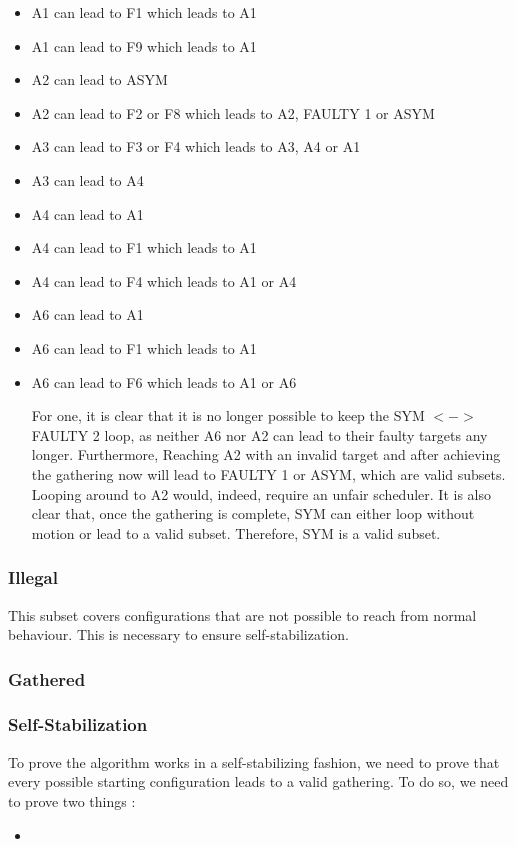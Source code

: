 \documentclass[11pt]{article}
\begin{document}
\begin{itemize}
\item A1 can lead to F1 which leads to A1 
\item A1 can lead to F9 which leads to A1 

\item A2 can lead to ASYM
\item A2 can lead to F2 or F8 which leads to A2, FAULTY 1 or ASYM

\item A3 can lead to F3 or F4 which leads to A3, A4 or A1
\item A3 can lead to A4 

\item A4 can lead to A1
\item A4 can lead to F1 which leads to A1 
\item A4 can lead to F4 which leads to A1 or A4

\item A6 can lead to A1 
\item A6 can lead to F1 which leads to A1 
\item A6 can lead to F6 which leads to A1 or A6

For one, it is clear that it is no longer possible to keep the SYM $<->$ FAULTY 2 loop, as neither A6 nor A2 can lead to their faulty targets any longer. Furthermore, Reaching A2 with an invalid target and after achieving the gathering now will lead to FAULTY 1 or ASYM, which are valid subsets. Looping around to A2 would, indeed, require an unfair scheduler.
It is also clear that, once the gathering is complete, SYM can either loop without motion or lead to a valid subset. Therefore, SYM is a valid subset.

\end{itemize}
\subsubsection{Illegal}

This subset covers configurations that are not possible to reach from normal behaviour. This is necessary to ensure self-stabilization.

\subsubsection{Gathered}

\subsubsection{Self-Stabilization}

To prove the algorithm works in a self-stabilizing fashion, we need to prove that every possible starting configuration leads to a valid gathering. To do so, we need to prove two things : 

\begin{itemize}
\item 
\end{itemize}
\end{document}
